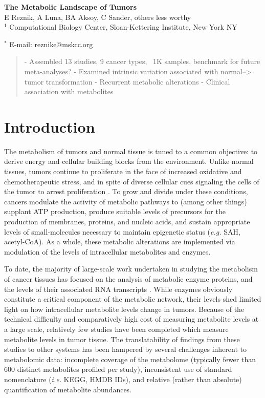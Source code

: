 \documentclass[10pt]{article}
\date{}
\begin{document}
\begin{flushleft}
{\Large
\textbf{The Metabolic Landscape of Tumors}
}
\\
E Reznik, A Luna, BA Aksoy, C Sander, others less worthy
\\
$^1$ Computational Biology Center, Sloan-Kettering Institute, New York NY

$^\ast$ E-mail: reznike@mskcc.org
\end{flushleft}

\begin{abstract}
- Assembled 13 studies, 9 cancer types, ~1K samples, benchmark for future meta-analyses?
- Examined intrinsic variation associated with normal--> tumor transformation
- Recurrent metabolic alterations
- Clinical association with metabolites
\end{abstract}

\section{Introduction}

The metabolism of tumors and normal tissue is tuned to a common objective: to derive energy and cellular building blocks from the environment. Unlike normal tissues, tumors continue to proliferate in the face of increased oxidative and chemotherapeutic stress, and in spite of diverse cellular cues signaling the cells of the tumor to arrest proliferation \cite{Hanahan2011}. To grow and divide under these conditions, cancers modulate the activity of metabolic pathways to (among other things) supplant ATP production, produce suitable levels of precursors for the production of membranes, proteins, and nucleic acids, and sustain appropriate levels of small-molecules necessary to maintain epigenetic status (\textit{e.g.} SAH, acetyl-CoA). As a whole, these metabolic alterations are implemented via modulation of the levels of intracellular  metabolites and enzymes.

To date, the majority of large-scale work undertaken in studying the metabolism of cancer tissues has focused on the analysis of metabolic enzyme proteins, and the levels of their associated RNA transcripts \cite{Nilsson2014,Gatto2014,Hu2013}. While enzymes obviously constitute a critical component of the metabolic network, their levels shed limited light on how intracellular metabolite levels change in tumors. Because of the technical difficulty and comparatively high cost of measuring metabolite levels at a large scale, relatively few studies have been completed which measure metabolite levels in tumor tissue. The translatability of findings from these studies to other systems has been hampered by several challenges inherent to metabolomic data: incomplete coverage of the metabolome (typically fewer than 600 distinct metabolites profiled per study), inconsistent use of standard nomenclature (\textit{i.e.} KEGG, HMDB IDs), and relative (rather than absolute) quantification of metabolite abundances.  
\end{document}
